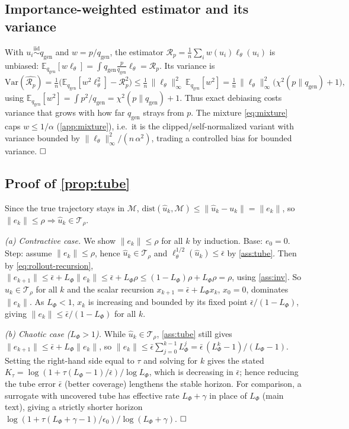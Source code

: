 \documentclass{article}
\theoremstyle{plain}
\theoremstyle{definition}
\theoremstyle{remark}
\newcommand{\E}{\mathbb{E}}
\newcommand{\state}{u}
\newcommand{\manifold}{\mathcal{M}}
\newcommand{\sol}{\Phi}
\newcommand{\lossf}{\ell_\theta}
\newcommand{\pnat}{p}
\newcommand{\qgen}{q_{\mathrm{gen}}}
\newcommand{\Rp}{\mathcal{R}_{\pnat}}
\newcommand{\tube}{\mathcal{T}_{\rho}}
\newcommand{\unif}{\alpha}
\newcommand{\dist}{\mathrm{dist}}
\begin{document}
\subsection{Importance-weighted estimator and its variance}\label{app:iw}
With $\state_i\stackrel{\text{iid}}\sim\qgen$ and $w=\pnat/\qgen$, the estimator
$\widehat{\Rp}=\frac1n\sum_i w(\state_i)\lossf(\state_i)$ is unbiased:
$\E_{\qgen}[w\lossf]=\int\qgen\frac{\pnat}{\qgen}\lossf=\Rp$. Its variance is
\[
  \mathrm{Var}(\widehat{\Rp})=\tfrac1n\Big(\E_{\qgen}[w^2\lossf^2]-\Rp^2\Big)
  \le \tfrac1n\,\|\lossf\|_\infty^2\,\E_{\qgen}[w^2]
  = \tfrac1n\,\|\lossf\|_\infty^2\big(\chi^2(\pnat\|\qgen)+1\big),
\]
using $\E_{\qgen}[w^2]=\int \pnat^2/\qgen=\chi^2(\pnat\|\qgen)+1$. Thus exact debiasing costs variance
that grows with how far $\qgen$ strays from $\pnat$. The mixture \eqref{eq:mixture} caps $w\le1/\unif$
(\cref{app:mixture}), i.e.\ it is the clipped/self-normalized variant with variance bounded by
$\|\lossf\|_\infty^2/(n\,\unif^2)$, trading a controlled bias for bounded variance. $\hfill\square$

\subsection{Proof of \cref{prop:tube}}\label{app:tube}
Since the true trajectory stays in $\manifold$, $\dist(\hat\state_k,\manifold)\le\|\hat\state_k-\state_k\|=\|e_k\|$,
so $\|e_k\|\le\rho\Rightarrow\hat\state_k\in\tube$.

\emph{(a) Contractive case.} We show $\|e_k\|\le\rho$ for all $k$ by induction. Base: $e_0=0$. Step:
assume $\|e_k\|\le\rho$, hence $\hat\state_k\in\tube$ and $\lossf^{1/2}(\hat\state_k)\le\bar\epsilon$ by
\cref{ass:tube}. Then by \eqref{eq:rollout-recursion},
$\|e_{k+1}\|\le\bar\epsilon+L_{\sol}\|e_k\|\le\bar\epsilon+L_{\sol}\rho\le(1-L_{\sol})\rho+L_{\sol}\rho=\rho$,
using \cref{ass:inv}. So $\hat\state_k\in\tube$ for all $k$ and the scalar recursion
$x_{k+1}=\bar\epsilon+L_{\sol}x_k$, $x_0=0$, dominates $\|e_k\|$. As $L_{\sol}<1$, $x_k$ is increasing and
bounded by its fixed point $\bar\epsilon/(1-L_{\sol})$, giving $\|e_k\|\le\bar\epsilon/(1-L_{\sol})$ for
all $k$.

\emph{(b) Chaotic case ($L_{\sol}>1$).} While $\hat\state_k\in\tube$, \cref{ass:tube} still gives
$\|e_{k+1}\|\le\bar\epsilon+L_{\sol}\|e_k\|$, so $\|e_k\|\le\bar\epsilon\sum_{j=0}^{k-1}L_{\sol}^j
=\bar\epsilon\,(L_{\sol}^k-1)/(L_{\sol}-1)$. Setting the right-hand side equal to $\tau$ and solving for
$k$ gives the stated $K_\tau=\log(1+\tau(L_{\sol}-1)/\bar\epsilon)/\log L_{\sol}$, which is decreasing in
$\bar\epsilon$; hence reducing the tube error $\bar\epsilon$ (better coverage) lengthens the stable
horizon. For comparison, a surrogate with uncovered tube has effective rate $L_{\sol}+\gamma$ in place of
$L_{\sol}$ (main text), giving a strictly shorter horizon
$\log(1+\tau(L_{\sol}+\gamma-1)/\epsilon_0)/\log(L_{\sol}+\gamma)$. $\hfill\square$
\end{document}
